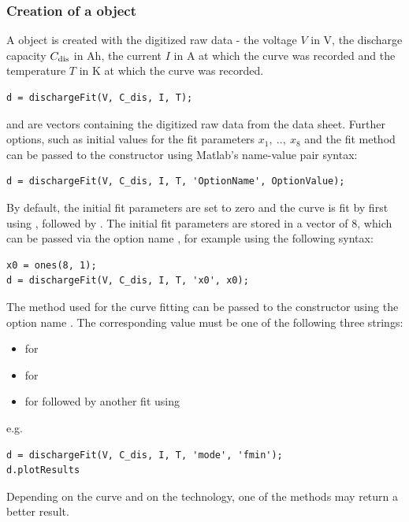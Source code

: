 \subsubsection{Creation of a  object}
A  object is created with the digitized raw data - the voltage $V$ in V, the discharge capacity $C_\text{dis}$ in Ah, the current $I$ in A at which the curve was recorded and the temperature $T$ in K at which the curve was recorded.
\begin{lstlisting}
d = dischargeFit(V, C_dis, I, T);
\end{lstlisting}
 and  are vectors containing the digitized raw data from the data sheet. Further options, such as initial values for the fit parameters $x_1,\ ..,\ x_8$ and the fit method can be passed to the constructor using Matlab's name-value pair syntax:
\begin{lstlisting}
d = dischargeFit(V, C_dis, I, T, 'OptionName', OptionValue);
\end{lstlisting}
By default, the initial fit parameters are set to zero and the curve is fit by first using , followed by . The initial fit parameters are stored in a vector  of  8, which can be passed via the option name , for example using the following syntax:
\begin{lstlisting}
x0 = ones(8, 1);
d = dischargeFit(V, C_dis, I, T, 'x0', x0);
\end{lstlisting}
The method used for the curve fitting can be passed to the constructor using the option name . The corresponding value must be one of the following three strings:
\begin{itemize}
	\item {} for 
	\item {} for 
	\item {} for  followed by another fit using 
\end{itemize}
e.g.
\begin{lstlisting}
d = dischargeFit(V, C_dis, I, T, 'mode', 'fmin');
d.plotResults
\end{lstlisting}
Depending on the curve and on the technology, one of the methods may return a better result.

